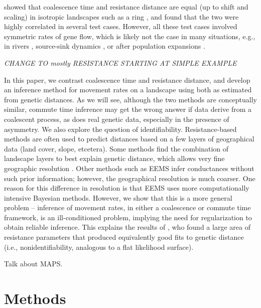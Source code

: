 \documentclass{article}
\newcommand{\plr}[1]{{\em \color{blue} #1}}
\begin{document}
\citet{mcrae2006isolation} showed that coalescence time and resistance distance are equal
(up to shift and scaling) in isotropic landscapes such as a ring \citep{matsen_wakeley},
and found that the two were highly correlated in several test cases.
However, all these test cases involved symmetric rates of gene flow,
which is likely not the case in many situations, e.g.,
in rivers \citep{morrissey2009maintenance,sundqvist2016directional,hanks2017modeling},
source-sink dynamics \citep{source_sink},
or after population expansions \citep{expansions}.

\plr{CHANGE TO mostly RESISTANCE STARTING AT SIMPLE EXAMPLE}

In this paper, we contrast 
coalescence time and resistance distance,
and develop an inference method for movement rates on a landscape
using both as estimated from genetic distances.
As we will see,
although the two methods are conceptually similar,
commute time inference may get the wrong answer if data derive from a coalescent process,
as does real genetic data, especially in the presence of asymmetry.
We also explore the question of identifiability.
Resistance-based methods are often used to predict distances based on a few layers of geographical data
(land cover, slope, etcetera).
Some methods find the combination of landscape layers to best explain genetic distance,
which allows very fine geographic resolution \citep{infer_resistance}.
Other methods such as EEMS \citep{petkova2016visualizing} infer conductances without such prior information;
however, the geographical resolution is much coarser.
One reason for this difference in resolution
is that EEMS uses more computationally intensive Bayesian methods.
However, we show that this is a more general problem --
inference of movement rates, in either a coalescence or commute time framework,
is an ill-conditioned problem,
implying the need for regularization to obtain reliable inference.
This explains the results of \citet{graves2013current},
who found a large area of resistance parameters
that produced equivalently good fits to genetic distance
(i.e., nonidentifiability, analogous to a flat likelihood surface).

Talk about MAPS.



\section*{Methods}
\end{document}

